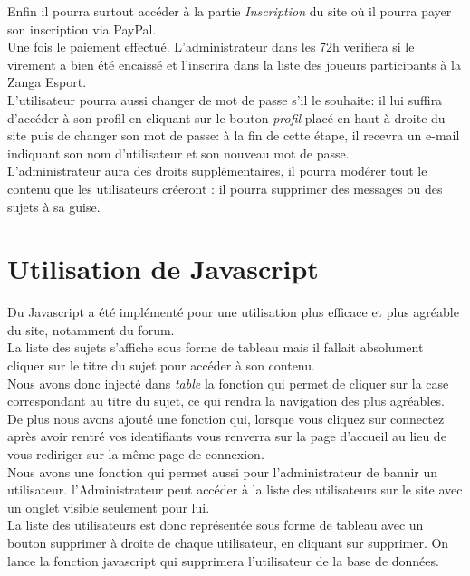 \documentclass[a4paper, 11pt]{article}
\begin{document}
Enfin il pourra surtout accéder à la partie \textit{Inscription} du site où il pourra payer son inscription via PayPal.\\
Une fois le paiement effectué. L'administrateur dans les 72h verifiera si le virement a bien été encaissé et l'inscrira dans la liste des joueurs participants à la Zanga Esport.\\
L'utilisateur pourra aussi changer de mot de passe s'il le souhaite: il lui suffira d'accéder à son profil en cliquant sur le bouton \textit{profil} placé en haut à droite du site puis de changer son mot de passe: à la fin de cette étape, il recevra un e-mail indiquant son nom d'utilisateur et son nouveau mot de passe.\\
L'administrateur aura des droits supplémentaires, il pourra modérer tout le contenu que les utilisateurs créeront : il pourra supprimer des messages ou
des sujets à sa guise.



\section{Utilisation de Javascript}
Du Javascript a été implémenté pour une utilisation plus efficace et plus agréable du site, notamment du forum.\\
La liste des sujets s'affiche sous forme de tableau mais il fallait absolument cliquer sur le titre du sujet pour accéder à son contenu.\\
Nous avons donc injecté dans \textit{table} la fonction qui permet de cliquer sur la case correspondant au titre du sujet, ce qui rendra la navigation des plus agréables.\\
De plus nous avons ajouté une fonction qui, lorsque vous cliquez sur connectez après avoir rentré vos identifiants vous renverra sur la page d'accueil au lieu de vous rediriger sur la même page de connexion.\\
Nous avons une fonction qui permet aussi pour l'administrateur de bannir un utilisateur. l'Administrateur peut accéder à la liste des utilisateurs sur le site avec un onglet visible seulement pour lui.\\
La liste des utilisateurs est donc représentée sous forme de tableau avec un bouton supprimer à droite de chaque utilisateur, en cliquant sur supprimer. On lance la fonction javascript qui supprimera l'utilisateur de la base de données.
\end{document}
